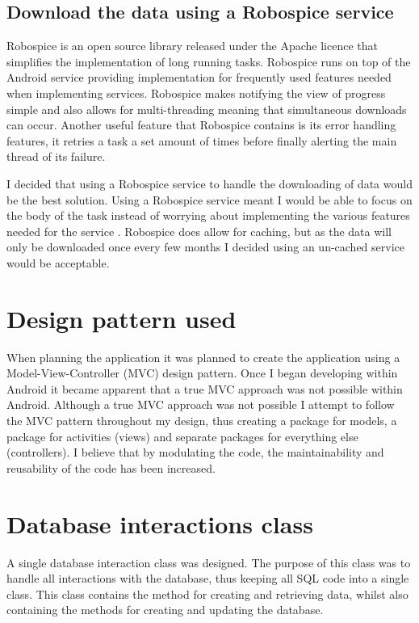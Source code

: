 \subsection{Download the data using a Robospice service}

Robospice \cite{robospice} is an open source library released under the Apache licence \cite{apache_licence} that simplifies the implementation of long running tasks. Robospice runs on top of the Android service providing implementation for frequently used features needed when implementing services. Robospice makes notifying the view of progress simple and also allows for multi-threading meaning that simultaneous downloads can occur. Another useful feature that Robospice contains is its error handling features, it retries a task a set amount of times \cite{robospice} before finally alerting the main thread of its failure.

I decided that using a Robospice service to handle the downloading of data would be the best solution. Using a Robospice service meant I would be able to focus on the body of the task instead of worrying about implementing the various features needed for the service \cite{robospice}. Robospice does allow for caching, but as the data will only be downloaded once every few months I decided using an un-cached service would be acceptable.


\section{Design pattern used}

When planning the application it was planned to create the application using a Model-View-Controller (MVC) \cite{mvc} design pattern. Once I began developing within Android it became apparent that a true MVC approach was not possible within Android. Although a true MVC approach was not possible I attempt to follow the MVC pattern throughout my design, thus creating a package for models, a package for activities (views) and separate packages for everything else (controllers). I believe that by modulating the code, the maintainability and reusability of the code has been increased.

\section{Database interactions class}
A single database interaction class was designed. The purpose of this class was to handle all interactions with the database, thus keeping all SQL code into a single class. This class contains the method for creating and retrieving data, whilst also containing the methods for creating and updating the database.

